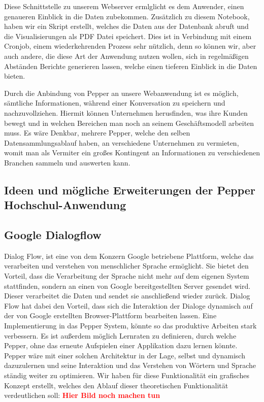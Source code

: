 Diese Schnittstelle zu unserem Webserver ermlglicht es dem Anwender, einen genaueren Einblick in die Daten zubekommen. Zusätzlich zu diesem Notebook, haben wir ein Skript erstellt, welches die Daten aus der Datenbank abruft und die Visualisierungen als PDF Datei speichert. Dies ist in Verbindung mit einem Cronjob, einem wiederkehrenden Prozess sehr nützlich, denn so können wir, aber auch andere, die diese Art der Anwendung nutzen wollen, sich in regelmäßigen Abständen Berichte generieren lassen, welche einen tieferen Einblick in die Daten bieten.

Durch die Anbindung von Pepper an unsere Webanwendung ist es möglich, sämtliche Informationen, während einer Konversation zu speichern und nachzuvollziehen. Hiermit können Unternehmen herusfinden, was ihre Kunden bewegt und in welchen Bereichen man noch an seinem Geschäftsmodell arbeiten muss. Es wäre Denkbar, mehrere Pepper, welche den selben Datensammlungsablauf haben, an verschiedene Unternehmen zu vermieten, womit man als Vermiter ein großes Kontingent an Informationen zu verschiedenen Branchen sammeln und auswerten kann.\\

\subsection{Ideen und mögliche Erweiterungen der Pepper Hochschul-Anwendung}

\subsection{Google Dialogflow}

Dialog Flow, ist eine von dem Konzern Google betriebene Plattform, welche das verarbeiten und verstehen von menschlicher Sprache ermöglicht. Sie bietet den Vorteil, dass die Verarbeitung der Sprache nicht mehr auf dem eigenen System stattfinden, sondern an einen von Google bereitgestellten Server gesendet wird. Dieser verarbeitet die Daten und sendet sie anschließend wieder zurück. Dialog Flow hat dabei den Vorteil, dass sich die Interaktion der Dialoge dynamisch auf der von Google erstellten Browser-Plattform bearbeiten lassen. Eine Implementierung in das Pepper System, könnte so das produktive Arbeiten stark verbessern. Es ist außerdem möglich Lernraten zu definieren, durch welche Pepper, ohne das erneute Aufspielen einer Applikation dazu lernen könnte. Pepper wäre mit einer solchen Architektur in der Lage, selbst und dynamisch dazuzulernen und seine Interaktion und das Verstehen von Wörtern und Sprache ständig weiter zu optimieren. Wir haben für diese Funktionalität ein grafisches Konzept erstellt, welches den Ablauf dieser theoretischen Funktionalität verdeutlichen soll:
\textcolor{red}{\textbf{Hier Bild  noch machen tun}}

